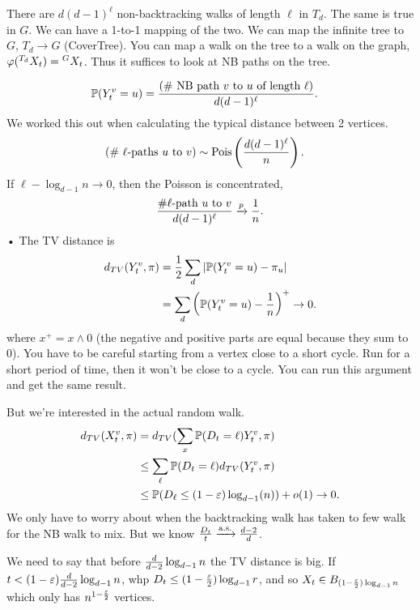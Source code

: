 There are $d(d-1)^\ell$ non-backtracking walks of length $\ell$ in $T_d$. The same is true in $G$. We can have a 1-to-1 mapping of the two. We can map the infinite tree to $G$, $T_d\to G$ (CoverTree). You can map a walk on the tree to a walk on the graph, $\varphi({}^{T_d}X_t) = {}^GX_t$. Thus it suffices to look at NB paths on the tree.

\begin{align}
\mathbb{P}(Y_t^v = u) &= \frac{\left( \text{\# NB path $v$ to $u$ of length $\ell$} \right)}{d(d-1)^\ell}.
\end{align}
We worked this out when calculating the typical distance between 2 vertices.
\begin{align}
\left( \text{\# $\ell$-paths $u$ to $v$} \right)
&\sim \operatorname{Pois}\left( {\frac{d(d-1)^\ell}{n}} \right).
\end{align}
If $\ell-\log_{d-1} n\to 0$, then the Poisson is concentrated,
\begin{align}
\frac{\#\ell\text{-path $u$ to $v$}}{d(d-1)^\ell}\xrightarrow{p} \frac{1}{n}.
\end{align}•
The TV distance is
\begin{align}
d_{TV}(Y_t^v,\pi) 
&= \frac{1}{2} \sum_d|\mathbb{P}(Y_t^v=u) - \pi_u|\\
&=  \sum_d\left( {\mathbb{P}(Y_t^v=u) - \frac{1}{n}} \right)^+\to 0.
\end{align}
where $x^+=x\wedge 0$ (the negative and positive parts are equal because they sum to 0).
You have to be careful starting from a vertex close to a short cycle. Run for a short period of time, then it won't be close to a cycle. You can run this argument and get the same result.

But we're interested in the actual random walk. 
\begin{align}
d_{TV} (X_t^v, \pi) 
&= d_{TV}(\sum_x \mathbb{P}(D_t=\ell) Y_t^v,\pi)\\
&\le \sum_\ell \mathbb{P}(D_t=\ell) d_{TV}(Y_t^v,\pi)\\
&\le \mathbb{P}(D_\ell \le (1-\varepsilon) \log_{d-1}(n)) + o(1)\to 0.
\end{align}
We only have to worry about when the backtracking walk has taken to few walk for the NB walk to mix. But we know $\frac{D_t}{t}\xrightarrow{\text{a.s.}} \frac{d-2}{d}$. 

We need to say that before $\frac{d}{d-2}\log_{d-1}n$ the TV distance is big. If $t<(1-\varepsilon)\frac{d}{d-2} \log_{d-1}n$, whp $D_t\le (1-\frac{\varepsilon}{2})\log_{d-1}r$, and so $X_t\in B_{(1-\frac{\varepsilon}{2}) \log_{d-1}n}$ which only has $n^{1-\frac{\varepsilon}{2}}$ vertices.

